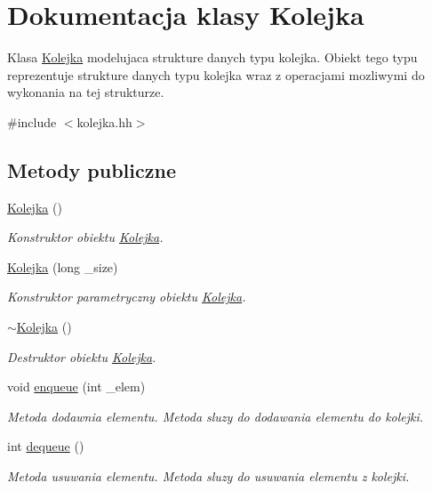 \hypertarget{class_kolejka}{\section{Dokumentacja klasy Kolejka}
\label{class_kolejka}
}


Klasa \hyperlink{class_kolejka}{Kolejka} modelujaca strukture danych typu kolejka. Obiekt tego typu reprezentuje strukture danych typu kolejka wraz z operacjami mozliwymi do wykonania na tej strukturze.  




{\ttfamily \#include $<$kolejka.\-hh$>$}

\subsection*{Metody publiczne}
\begin{DoxyCompactItemize}
\item 
\hyperlink{class_kolejka_a37c886fdc73dce62b04da0381dec5484}{Kolejka} ()
\begin{DoxyCompactList}\small\item\em Konstruktor obiektu \hyperlink{class_kolejka}{Kolejka}. \end{DoxyCompactList}\item 
\hyperlink{class_kolejka_ac942cc97bf0d2c30d11611c406acc5a8}{Kolejka} (long \-\_\-size)
\begin{DoxyCompactList}\small\item\em Konstruktor parametryczny obiektu \hyperlink{class_kolejka}{Kolejka}. \end{DoxyCompactList}\item 
\hyperlink{class_kolejka_a352f86ff08cd47be6c35c60bb0f873a6}{$\sim$\-Kolejka} ()
\begin{DoxyCompactList}\small\item\em Destruktor obiektu \hyperlink{class_kolejka}{Kolejka}. \end{DoxyCompactList}\item 
void \hyperlink{class_kolejka_a8f3b0111e85f517d9eadb8ce996d4471}{enqueue} (int \-\_\-elem)
\begin{DoxyCompactList}\small\item\em Metoda dodawnia elementu. Metoda sluzy do dodawania elementu do kolejki. \end{DoxyCompactList}\item 
int \hyperlink{class_kolejka_af23261614bcf242a1934a99688a2debc}{dequeue} ()
\begin{DoxyCompactList}\small\item\em Metoda usuwania elementu. Metoda sluzy do usuwania elementu z kolejki. \end{DoxyCompactList}\end{DoxyCompactItemize}
